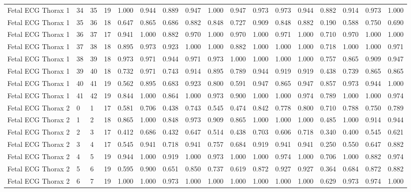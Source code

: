 \begin{longtable}{lllllllllllllllll}
Fetal ECG Thorax 1 & 34 & 35 & 19 & 1.000 & 0.944 & 0.889 & 0.947 & 1.000 & 0.947 & 0.973 & 0.973 & 0.944 & 0.882 & 0.914 & 0.973 & 1.000 \\
Fetal ECG Thorax 1 & 35 & 36 & 18 & 0.647 & 0.865 & 0.686 & 0.882 & 0.848 & 0.727 & 0.909 & 0.848 & 0.882 & 0.190 & 0.588 & 0.750 & 0.690 \\
Fetal ECG Thorax 1 & 36 & 37 & 17 & 0.941 & 1.000 & 0.882 & 0.970 & 1.000 & 0.970 & 1.000 & 0.971 & 1.000 & 0.710 & 0.970 & 1.000 & 1.000 \\
Fetal ECG Thorax 1 & 37 & 38 & 18 & 0.895 & 0.973 & 0.923 & 1.000 & 1.000 & 0.882 & 1.000 & 1.000 & 1.000 & 0.718 & 1.000 & 1.000 & 0.971 \\
Fetal ECG Thorax 1 & 38 & 39 & 18 & 0.973 & 0.971 & 0.944 & 0.971 & 0.973 & 1.000 & 1.000 & 1.000 & 1.000 & 0.757 & 0.865 & 0.909 & 0.947 \\
Fetal ECG Thorax 1 & 39 & 40 & 18 & 0.732 & 0.971 & 0.743 & 0.914 & 0.895 & 0.789 & 0.944 & 0.919 & 0.919 & 0.438 & 0.739 & 0.865 & 0.865 \\
Fetal ECG Thorax 1 & 40 & 41 & 19 & 0.562 & 0.895 & 0.683 & 0.923 & 0.800 & 0.591 & 0.947 & 0.865 & 0.947 & 0.857 & 0.973 & 0.944 & 1.000 \\
Fetal ECG Thorax 1 & 41 & 42 & 19 & 0.844 & 1.000 & 0.864 & 1.000 & 0.973 & 0.900 & 1.000 & 1.000 & 0.974 & 0.789 & 1.000 & 1.000 & 0.974 \\
Fetal ECG Thorax 2 & 0 & 1 & 17 & 0.581 & 0.706 & 0.438 & 0.743 & 0.545 & 0.474 & 0.842 & 0.778 & 0.800 & 0.710 & 0.788 & 0.750 & 0.789 \\
Fetal ECG Thorax 2 & 1 & 2 & 18 & 0.865 & 1.000 & 0.848 & 0.973 & 0.909 & 0.865 & 1.000 & 1.000 & 1.000 & 0.485 & 1.000 & 0.914 & 0.944 \\
Fetal ECG Thorax 2 & 2 & 3 & 17 & 0.412 & 0.686 & 0.432 & 0.647 & 0.514 & 0.438 & 0.703 & 0.606 & 0.718 & 0.340 & 0.400 & 0.545 & 0.621 \\
Fetal ECG Thorax 2 & 3 & 4 & 17 & 0.545 & 0.941 & 0.718 & 0.941 & 0.757 & 0.684 & 0.919 & 0.941 & 0.941 & 0.250 & 0.550 & 0.647 & 0.882 \\
Fetal ECG Thorax 2 & 4 & 5 & 19 & 0.944 & 1.000 & 0.919 & 1.000 & 0.973 & 1.000 & 1.000 & 0.974 & 1.000 & 0.706 & 1.000 & 0.882 & 0.974 \\
Fetal ECG Thorax 2 & 5 & 6 & 19 & 0.595 & 0.900 & 0.651 & 0.850 & 0.737 & 0.619 & 0.872 & 0.927 & 0.927 & 0.364 & 0.684 & 0.872 & 0.882 \\
Fetal ECG Thorax 2 & 6 & 7 & 19 & 1.000 & 1.000 & 0.973 & 1.000 & 1.000 & 1.000 & 1.000 & 1.000 & 1.000 & 0.629 & 0.973 & 0.974 & 1.000 \\

\end{longtable}
